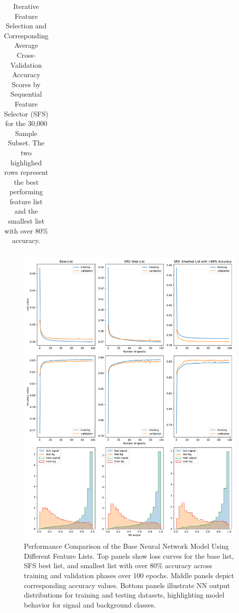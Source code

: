 \documentclass[]{article}
\begin{document}
\begin{landscape}
\begin{table}[]
{\begin{tabular}{@{}lr@{}}
	\end{tabular}
	}
	\caption{Iterative Feature Selection and Corresponding Average Cross-Validation Accuracy Scores by Sequential Feature Selector (SFS) for the 30,000 Sample Subset. The two highlighed rows represent the best performing feature list and the smallest list with over $80\%$ accuracy.}
	\label{table:SFS_results}
\end{table}

\end{landscape}

\begin{figure}[h!]
	\centering
	\includegraphics[width=\linewidth]{feature_comparison/feat-comparison.pdf}
	\caption{Performance Comparison of the Base Neural Network Model Using Different Feature Lists. Top panels show loss curves for the base list, SFS best list, and smallest list with over $80\%$ accuracy across training and validation phases over 100 epochs. Middle panels depict corresponding accuracy values. Bottom panels illustrate NN output distributions for training and testing datasets, highlighting model behavior for signal and background classes.}
	\label{fig:base_models}
\end{figure}
\end{document}
